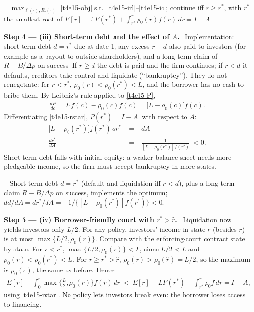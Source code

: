 \documentclass[11pt,a4paper]{article}
\newcommand{\step}[2]{\par\medskip\noindent\textbf{Step #1 --- #2.}~}
\newcommand{\answer}[1]{\par\smallskip\noindent\fbox{\textbf{Answer #1.}}~}
\begin{document}
\answer{(ii)} $\max_{\ell(\cdot),R_b(\cdot)}$ \eqref{t4e15-obj} s.t.\ \eqref{t4e15-irl}--\eqref{t4e15-ic};
continue iff $r\ge r^*$, with $r^*$ the smallest root of
$E[r]+LF(r^*)+\int_{r^*}^{\bar r}\rho_0(r)f(r)\,dr=I-A$.

\step{4}{(iii) Short-term debt and the effect of $A$} Implementation: short-term debt $d=r^*$ due at
date 1, any excess $r-d$ also paid to investors (for example as a payout to outside shareholders), and a
long-term claim of $R-B/\Delta p$ on success. If $r\ge d$ the debt is paid and the firm continues; if
$r<d$ it defaults, creditors take control and liquidate (``bankruptcy''). They do not renegotiate:
for $r<r^*$, $\rho_0(r)<\rho_0(r^*)<L$, and the borrower has no cash to bribe them. By Leibniz's
rule applied to \eqref{t4e15-P},
\begin{align}
  \frac{dP}{dc}=L\,f(c)-\rho_0(c)f(c)=\big[L-\rho_0(c)\big]f(c). \nonumber
\end{align}
Differentiating \eqref{t4e15-rstar}, $P(r^*)=I-A$, with respect to $A$:
\begin{align}
  \big[L-\rho_0(r^*)\big]f(r^*)\,dr^* &= -dA \nonumber\\
  \frac{dr^*}{dA} &= -\frac{1}{[L-\rho_0(r^*)]f(r^*)}\ <0. \label{t4e15-drA}
\end{align}
Short-term debt falls with initial equity: a weaker balance sheet needs more pledgeable income, so the
firm must accept bankruptcy in more states.

\answer{(iii)} Short-term debt $d=r^*$ (default and liquidation iff $r<d$), plus a long-term claim
$R-B/\Delta p$ on success, implements the optimum; $dd/dA=dr^*/dA=-1/\{[L-\rho_0(r^*)]f(r^*)\}<0$.

\step{5}{(iv) Borrower-friendly court with $r^*>\hat r$} Liquidation now yields investors only $L/2$. For
any policy, investors' income in state $r$ (besides $r$) is at most $\max\{L/2,\rho_0(r)\}$. Compare
with the enforcing-court contract state by state. For $r<r^*$, $\max\{L/2,\rho_0(r)\}<L$, since
$L/2<L$ and $\rho_0(r)<\rho_0(r^*)<L$. For $r\ge r^*>\hat r$, $\rho_0(r)>\rho_0(\hat r)=L/2$, so the
maximum is $\rho_0(r)$, the same as before. Hence
\begin{align}
  E[r]+\int_0^{\bar r}\max\Big\{\frac L2,\rho_0(r)\Big\}f(r)\,dr\ <\ E[r]+LF(r^*)+\int_{r^*}^{\bar r}\rho_0f\,dr = I-A, \label{t4e15-iv}
\end{align}
using \eqref{t4e15-rstar}. No policy lets investors break even: the borrower loses access to financing.
\end{document}
